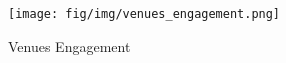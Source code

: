 \begin{figure}
    \centering
    \texttt{[image: fig/img/venues\_engagement.png]}
    \caption{Venues Engagement}
    \label{fig:venues_engagement}
\end{figure}